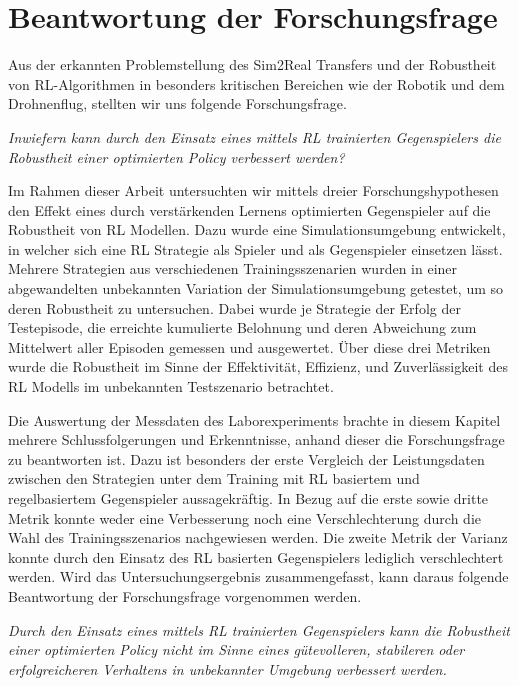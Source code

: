 \section{Beantwortung der Forschungsfrage}

Aus der erkannten Problemstellung des Sim2Real Transfers und der Robustheit von RL-Algorithmen in besonders kritischen Bereichen wie der Robotik und dem Drohnenflug, stellten wir uns folgende Forschungsfrage.

\textit{Inwiefern kann durch den Einsatz eines mittels RL trainierten Gegenspielers die Robustheit einer optimierten Policy verbessert werden?}

Im Rahmen dieser Arbeit untersuchten wir mittels dreier Forschungshypothesen den Effekt eines durch verstärkenden Lernens optimierten Gegenspieler auf die Robustheit von RL Modellen.
Dazu wurde eine Simulationsumgebung entwickelt, in welcher sich eine RL Strategie als Spieler und als Gegenspieler einsetzen lässt.
Mehrere Strategien aus verschiedenen Trainingsszenarien wurden in einer abgewandelten unbekannten Variation der Simulationsumgebung getestet, um so deren Robustheit zu untersuchen.
Dabei wurde je Strategie der Erfolg der Testepisode, die erreichte kumulierte Belohnung und deren Abweichung zum Mittelwert aller Episoden gemessen und ausgewertet. 
Über diese drei Metriken wurde die Robustheit im Sinne der Effektivität, Effizienz, und Zuverlässigkeit des RL Modells im unbekannten Testszenario betrachtet.

Die Auswertung der Messdaten des Laborexperiments brachte in diesem Kapitel mehrere Schlussfolgerungen und Erkenntnisse, anhand dieser die Forschungsfrage zu beantworten ist.
Dazu ist besonders der erste Vergleich der Leistungsdaten zwischen den Strategien unter dem Training mit RL basiertem und regelbasiertem Gegenspieler aussagekräftig.
In Bezug auf die erste sowie dritte Metrik konnte weder eine Verbesserung noch eine Verschlechterung durch die Wahl des Trainingsszenarios nachgewiesen werden.
Die zweite Metrik der Varianz konnte durch den Einsatz des RL basierten Gegenspielers lediglich verschlechtert werden.
Wird das Untersuchungsergebnis zusammengefasst, kann daraus folgende Beantwortung der Forschungsfrage vorgenommen werden.

\textit{Durch den Einsatz eines mittels RL trainierten Gegenspielers kann die Robustheit einer optimierten Policy nicht im Sinne eines gütevolleren, stabileren oder erfolgreicheren Verhaltens in unbekannter Umgebung verbessert werden.}

